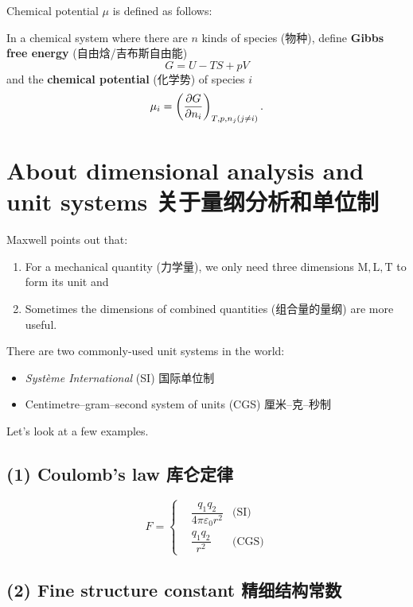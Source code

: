 Chemical potential \(\mu\) is defined as follows:

In a chemical system where there are \(n\) kinds of species (物种),
define \textbf{Gibbs free energy} (自由焓/吉布斯自由能) \[G=U-TS+pV\]
and the \textbf{chemical potential} (化学势) of species \(i\)
\[\mu_i = \left({\partial G \over \partial n_i}\right)_{T, p, n_j (j \neq i)}.\]

\section{About dimensional analysis and unit systems
关于量纲分析和单位制}\label{something-about-dimensional-analysis-and-unit-systems-ux4e00ux4e9bux5173ux4e8eux91cfux7eb2ux5206ux6790ux548cux5355ux4f4dux5236ux7684ux4e1cux897f}

Maxwell points out that:

\begin{enumerate}
\def\labelenumi{\arabic{enumi}.}
\item
  For a mechanical quantity (力学量), we only need three dimensions
  \(\mathrm{M, L, T}\) to form its unit and
\item
  Sometimes the dimensions of combined quantities (组合量的量纲) are
  more useful.
\end{enumerate}

There are two commonly-used unit systems in the world:

\begin{itemize}
\tightlist{}
\item \emph{Système
International} (SI) 国际单位制
\item Centimetre--gram--second system of units (CGS) 厘米--克--秒制
\end{itemize}

Let's look at a few examples.

\subsection*{(1) Coulomb's law
库仑定律}\label{coulombs-law-ux5e93ux4ed1ux5b9aux5f8b}

\[F = \left\{
\begin{aligned}
& \dfrac{q_1q_2}{4 \pi \varepsilon_0 r^2} & \text{(SI)} \\
& \dfrac{q_1q_2}{r^2} & \text{(CGS)}
\end {aligned}
\right.
\]

\subsection*{(2) Fine structure constant
精细结构常数}\label{fine-structure-constant-ux7cbeux7ec6ux7ed3ux6784ux5e38ux6570}

